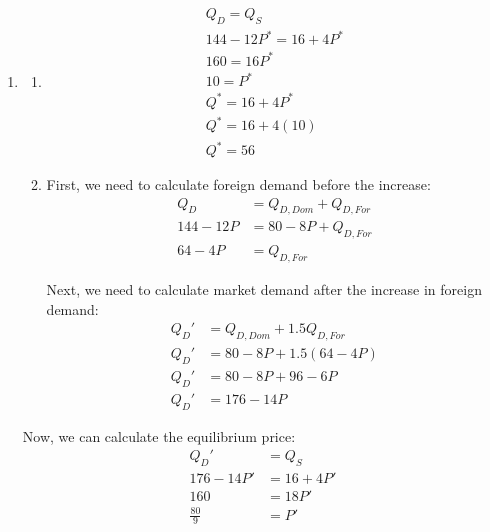 \documentclass{article}
\begin{document}
\begin{enumerate}
\item
	\begin{enumerate}
	
	\item
	\begin{gather*}
	Q_D = Q_S \\
	144 - 12P^* = 16 + 4P^* \\
	160 = 16P^* \\
	10 = P^* \\
	Q^* = 16 + 4P^* \\
	Q^* = 16 + 4(10) \\
	Q^* = 56
	\end{gather*}
	
	\item First, we need to calculate foreign demand before the increase:
	\begin{align*}
	Q_D &= Q_{D,Dom} + Q_{D,For} \\
	144 - 12 P &= 80 - 8P + Q_{D,For} \\
	64 - 4P &= Q_{D,For}
	\end{align*}
	
	Next, we need to calculate market demand after the increase in foreign demand:
	\begin{align*}
	Q_D' &= Q_{D,Dom} + 1.5Q_{D,For} \\
	Q_D' &= 80 - 8P + 1.5(64 - 4P) \\
	Q_D' &= 80 - 8P + 96 - 6P \\
	Q_D' &= 176 - 14P
	\end{align*}
	\end{enumerate}
	
	Now, we can calculate the equilibrium price:
	\begin{align*}
	Q_D' &= Q_S \\
	176 - 14P' &= 16 + 4P' \\
	160 &= 18P' \\
	\frac{80}{9} &= P'
	\end{align*}

\end{enumerate}
\end{document}
